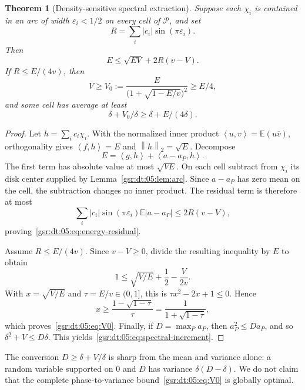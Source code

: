 \documentclass[11pt,letterpaper]{article}
\numberwithin{equation}{section}
\newtheorem{theorem}{Theorem}[section]
\theoremstyle{definition}
\theoremstyle{remark}
\newcommand{\E}{\mathbb E}
\newcommand{\1}{\mathbf 1}
\newcommand{\norm}[1]{\left\|#1\right\|}
\newcommand{\ip}[2]{\left\langle #1,#2\right\rangle}
\newcommand{\eps}{\varepsilon}
\begin{document}
\begin{theorem}[Density-sensitive spectral extraction]
\label{gsr:dt:05:thm:spectral}
Suppose each $\chi_i$ is contained in an arc of width $\eps_i<1/2$ on every cell of $\mathcal P$, and set
\begin{equation}
 R=\sum_i|c_i|\sin(\pi\eps_i).
 \label{gsr:dt:05:eq:Rbudget}
\end{equation}
Then
\begin{equation}
 E\leq\sqrt{EV}+2R(v-V).
 \label{gsr:dt:05:eq:energy-residual}
\end{equation}
If $R\leq E/(4v)$, then
\begin{equation}
 V\geq V_0:=\frac{E}{\bigl(1+\sqrt{1-E/v}\bigr)^2}\geq E/4,
 \label{gsr:dt:05:eq:V0}
\end{equation}
and some cell has average at least
\begin{equation}
 \delta+V_0/\delta\geq\delta+E/(4\delta).
 \label{gsr:dt:05:eq:spectral-increment}
\end{equation}
\end{theorem}
\begin{proof}
Let $h=\sum_i c_i\chi_i$. With the normalized inner product $\ip uv=\E(u\overline v)$, orthogonality gives $\ip f h=E$ and $\norm h_2=\sqrt E$. Decompose
\[
 E=\ip g h+\ip{a-a_P}h.
\]
The first term has absolute value at most $\sqrt{VE}$. On each cell subtract from $\chi_i$ its disk center supplied by Lemma~\ref{gsr:dt:05:lem:arc}. Since $a-a_P$ has zero mean on the cell, the subtraction changes no inner product. The residual term is therefore at most
\[
 \sum_i|c_i|\sin(\pi\eps_i)\E|a-a_P|\leq2R(v-V),
\]
proving~\eqref{gsr:dt:05:eq:energy-residual}.

Assume $R\leq E/(4v)$. Since $v-V\geq0$, divide the resulting inequality by $E$ to obtain
\[
 1\leq\sqrt{V/E}+\frac12-\frac{V}{2v}.
\]
With $x=\sqrt{V/E}$ and $\tau=E/v\in(0,1]$, this is $\tau x^2-2x+1\leq0$. Hence
\[
 x\geq\frac{1-\sqrt{1-\tau}}\tau
 =\frac1{1+\sqrt{1-\tau}},
\]
which proves~\eqref{gsr:dt:05:eq:V0}. Finally, if $D=\max_P a_P$, then $a_P^2\leq Da_P$, and so $\delta^2+V\leq D\delta$. This yields~\eqref{gsr:dt:05:eq:spectral-increment}.
\end{proof}

The conversion $D\geq\delta+V/\delta$ is sharp from the mean and variance alone: a random variable supported on $0$ and $D$ has variance $\delta(D-\delta)$. We do not claim that the complete phase-to-variance bound~\eqref{gsr:dt:05:eq:V0} is globally optimal.
\end{document}
